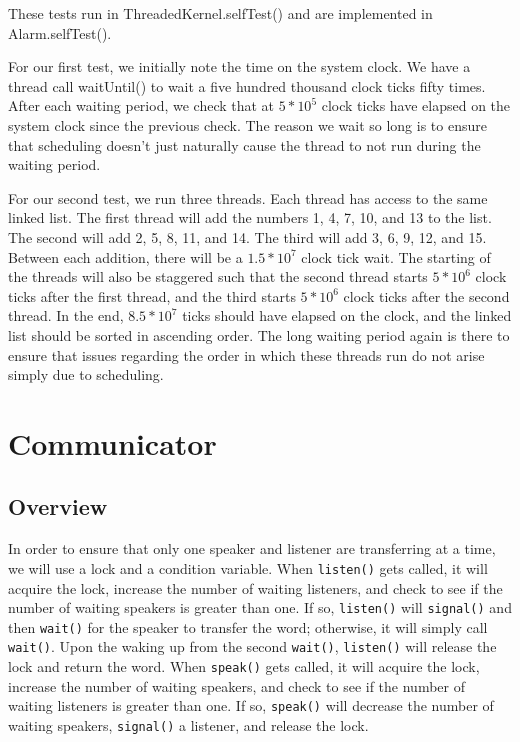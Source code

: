 \documentclass{article}
\begin{document}
These tests run in ThreadedKernel.selfTest() and are implemented in Alarm.selfTest().

For our first test, we initially note the time on the system clock. We have a thread call waitUntil() to wait a five hundred thousand clock ticks fifty times. After each waiting period, we check that at $5*10^5$ clock ticks have elapsed on the system clock since the previous check. The reason we wait so long is to ensure that scheduling doesn't just naturally cause the thread to not run during the waiting period.

For our second test, we run three threads. Each thread has access to the same linked list. The first thread will add the numbers 1, 4, 7, 10, and 13 to the list. The second will add 2, 5, 8, 11, and 14. The third will add 3, 6, 9, 12, and 15. Between each addition, there will be a $1.5*10^7$ clock tick wait. The starting of the threads will also be staggered such that the second thread starts $5*10^6$ clock ticks after the first thread, and the third starts $5*10^6$ clock ticks after the second thread. In the end, $8.5*10^7$ ticks should have elapsed on the clock, and the linked list should be sorted in ascending order. The long waiting period again is there to ensure that issues regarding the order in which these threads run do not arise simply due to scheduling.

\section{Communicator}

\subsection{Overview}
In order to ensure that only one speaker and listener are transferring at a time, we will use a lock and a condition variable. When \texttt{listen()} gets called, it will acquire the lock, increase the number of waiting listeners, and check to see if the number of waiting speakers is greater than one. If so, \texttt{listen()} will \texttt{signal()} and then \texttt{wait()} for the speaker to transfer the word; otherwise, it will simply call \texttt{wait()}. Upon the waking up from the second \texttt{wait()}, \texttt{listen()} will release the lock and return the word. When \texttt{speak()} gets called, it will acquire the lock, increase the number of waiting speakers, and check to see if the number of waiting listeners is greater than one. If so, \texttt{speak()} will decrease the number of waiting speakers, \texttt{signal()} a listener, and release the lock.
\end{document}
